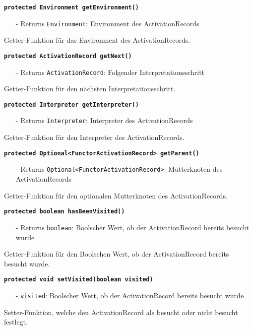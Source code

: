 \documentclass[parskip=full,11pt,twoside]{scrartcl}
\begin{document}
\textbf{\texttt{protected Environment getEnvironment()}}
\begin{itemize}[noitemsep]
	\item[-] Returns \texttt{Environment}: Environment des ActivationRecords
\end{itemize}
Getter-Funktion für das Environment des ActivationRecords.

\textbf{\texttt{protected ActivationRecord getNext()}}
\begin{itemize}[noitemsep]
	\item[-] Returns \texttt{ActivationRecord}: Folgender Interpretationsschritt
\end{itemize}
Getter-Funktion für den nächsten Interpretationsschritt.

\textbf{\texttt{protected Interpreter getInterpreter()}}
\begin{itemize}[noitemsep]
	\item[-] Returns \texttt{Interpreter}: Interpreter des ActivationRecords
\end{itemize}
Getter-Funktion für den Interpreter des ActivationRecords.

\textbf{\texttt{protected Optional<FunctorActivationRecord> getParent()}}
\begin{itemize}[noitemsep]
	\item[-] Returns \texttt{Optional<FunctorActivationRecord>}: Mutterknoten des ActivationRecords
\end{itemize}
Getter-Funktion für den optionalen Mutterknoten des ActivationRecords.

\textbf{\texttt{protected boolean hasBeenVisited()}}
\begin{itemize}[noitemsep]
	\item[-] Returns \texttt{boolean}: Boolscher Wert, ob der ActivationRecord bereits besucht wurde
\end{itemize}
Getter-Funktion für den Boolschen Wert, ob der ActivationRecord bereits besucht wurde.

\textbf{\texttt{protected void setVisited(boolean visited)}}
\begin{itemize}[noitemsep]
	\item[-] \texttt{visited}: Boolscher Wert, ob der ActivationRecord bereits besucht wurde
\end{itemize}
Setter-Funktion, welche den ActivationRecord als besucht oder nicht besucht festlegt.
\end{document}
